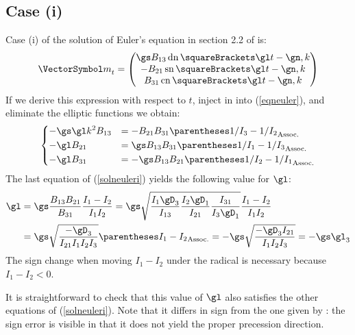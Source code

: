 \documentclass[10pt, a4paper, twoside]{basestyle}
\begin{document}
\subsection*{Case (i)}
Case (i) of the solution of Euler's equation in section 2.2 of \cite{Celledoni2007} is:
\[
{\vm}_t =
\begin{pmatrix}
\gs B_{13} \JacobiDN\of{\gl t - \gn, k} \\
-B_{21} \JacobiSN\of{\gl t - \gn, k} \\
B_{31} \JacobiCN\of{\gl t - \gn, k}
\end{pmatrix}
\]
If we derive this expression with respect to $t$, inject in into (\ref{eqneuler}), and eliminate the elliptic functions we obtain:
\begin{equation}
\begin{dcases}
-\gs \gl k^2 B_{13} &= -B_{21} B_{31} \pa{1/I_3 - 1/I_2} \\
-\gl B_{21} &= \gs B_{13} B_{31} \pa{1/I_1 - 1/I_3} \\
-\gl B_{31} &= -\gs B_{13} B_{21} \pa{1/I_2 - 1/I_1}
\end{dcases}
\label{solneuleri}
\end{equation}
The last equation of (\ref{solneuleri}) yields the following value for $\gl$:
\begin{align*}
\gl &= \gs \frac{B_{13} B_{21}}{B_{31}} \frac{I_1 - I_2}{I_1 I_2}
= \gs\sqrt{\frac{I_1 \gD_3}{I_{13}} \frac{I_2 \gD_1}{I_{21}} \frac{I_{31}}{I_3 \gD_1}} \frac{I_1 - I_2}{I_1 I_2} \\
&= \gs\sqrt{\frac{-\gD_3}{I_{21} I_1 I_2 I_3}} \pa{I_1 - I_2}
= -\gs\sqrt{\frac{-\gD_3 I_{21}}{I_1 I_2 I_3}}
= -\gs \gl_3
\end{align*}
The sign change when moving $I_1 - I_2$ under the radical is necessary because $I_1 - I_2 < 0$.

It is straightforward to check that this value of $\gl$ also satisfies the other equations of (\ref{solneuleri}).  Note that it
differs in sign from the one given by \cite{Celledoni2007}: the sign error is visible in that it does not yield the proper precession 
direction.
\end{document}
